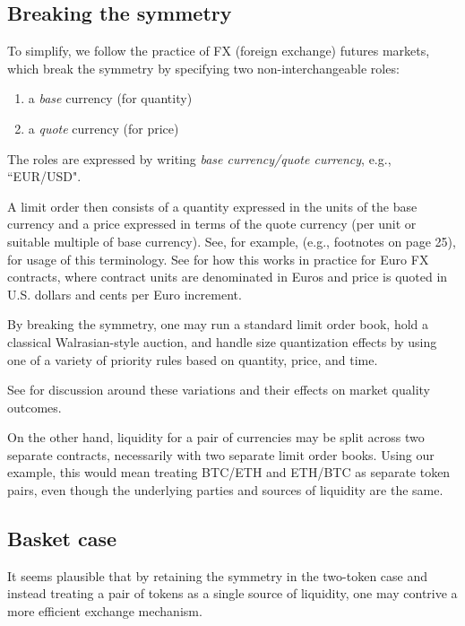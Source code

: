 \documentclass[11pt, reqno]{amsart}
\begin{document}
\subsection{Breaking the symmetry}
To simplify, we follow the practice of FX (foreign exchange) futures markets,
which break the symmetry by specifying two non-interchangeable roles:
\begin{enumerate}
	\item a \emph{base} currency (for quantity)
	\item a \emph{quote} currency (for price)
\end{enumerate}
The roles are expressed by writing \emph{base currency/quote currency}, e.g.,
``EUR/USD".

A limit order then consists of a quantity expressed in the units of the base
currency and a price expressed in terms of the quote currency (per unit or
suitable multiple of base currency). See, for example, \cite{Cme23} (e.g.,
footnotes on page 25), for usage of this terminology. See \cite{CmeFx} for how
this works in practice for Euro FX contracts, where contract units are
denominated in Euros and price is quoted in U.S. dollars and cents per Euro
increment.

By breaking the symmetry, one may run a standard limit order book, hold a
classical Walrasian-style auction, and handle size quantization effects by
using one of a variety of priority rules based on quantity, price, and time.

See \cite{BeLaLiVa22} for discussion around these variations and their effects
on market quality outcomes.

On the other hand, liquidity for a pair of currencies may be split across two
separate contracts, necessarily with two separate limit order books. Using our
example, this would mean treating BTC/ETH and ETH/BTC as separate token pairs,
even though the underlying parties and sources of liquidity are the same.

\subsection{Basket case}
It seems plausible that by retaining the symmetry in the two-token case and
instead treating a pair of tokens as a single source of liquidity, one may
contrive a more efficient exchange mechanism.
\end{document}
